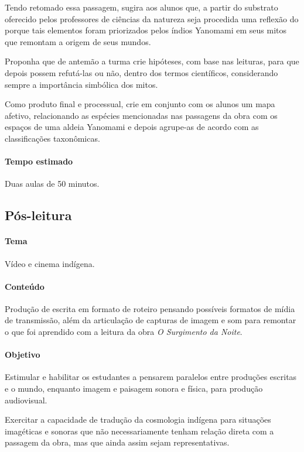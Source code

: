 \documentclass[12pt]{extarticle}
\begin{document}
Tendo retomado essa passagem, sugira aos alunos que, a partir do
substrato oferecido pelos professores de ciências da natureza seja
procedida uma reflexão do porque tais elementos foram priorizados pelos
índios Yanomami em seus mitos que remontam a origem de seus mundos.

Proponha que de antemão a turma crie hipóteses, com base nas leituras, para que 
depois possem refutá-las ou não, dentro dos termos científicos, considerando
sempre a importância simbólica dos mitos. 

Como produto final e processual, crie em conjunto com os alunos um mapa afetivo, relacionando as 
espécies mencionadas nas passagens da obra com os espaços de uma aldeia Yanomami e depois agrupe-as 
de acordo com as classificações taxonômicas.



\paragraph{Tempo estimado} Duas aulas de 50 minutos.


\subsection{Pós-leitura}

\paragraph{Tema} Vídeo e cinema indígena.

\paragraph{Conteúdo} Produção de escrita em formato de roteiro pensando possíveis
formatos de mídia de transmissão, além da articulação de capturas de imagem e som 
para remontar o que foi aprendido com a leitura da obra \textit{O Surgimento da Noite}.

\paragraph{Objetivo} Estimular e habilitar os estudantes a pensarem paralelos 
entre produções escritas e o mundo, enquanto imagem e paisagem sonora e física,
para produção audiovisual. 

Exercitar a capacidade de tradução da cosmologia indígena para situações imagéticas
e sonoras que não necessariamente tenham relação direta com a passagem da obra, mas 
que ainda assim sejam representativas.
\end{document}
